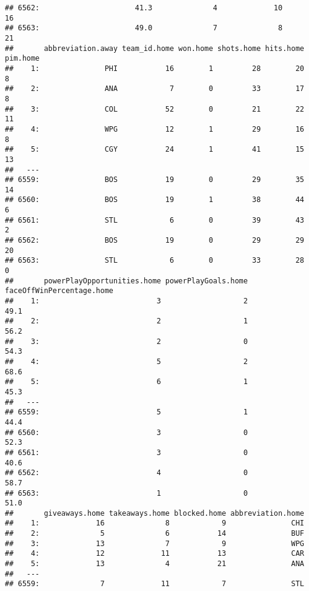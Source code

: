 \documentclass[
]{article}
\begin{document}
\begin{verbatim}
## 6562:                      41.3              4             10           16
## 6563:                      49.0              7              8           21
##       abbreviation.away team_id.home won.home shots.home hits.home pim.home
##    1:               PHI           16        1         28        20        8
##    2:               ANA            7        0         33        17        8
##    3:               COL           52        0         21        22       11
##    4:               WPG           12        1         29        16        8
##    5:               CGY           24        1         41        15       13
##   ---                                                                      
## 6559:               BOS           19        0         29        35       14
## 6560:               BOS           19        1         38        44        6
## 6561:               STL            6        0         39        43        2
## 6562:               BOS           19        0         29        29       20
## 6563:               STL            6        0         33        28        0
##       powerPlayOpportunities.home powerPlayGoals.home faceOffWinPercentage.home
##    1:                           3                   2                      49.1
##    2:                           2                   1                      56.2
##    3:                           2                   0                      54.3
##    4:                           5                   2                      68.6
##    5:                           6                   1                      45.3
##   ---                                                                          
## 6559:                           5                   1                      44.4
## 6560:                           3                   0                      52.3
## 6561:                           3                   0                      40.6
## 6562:                           4                   0                      58.7
## 6563:                           1                   0                      51.0
##       giveaways.home takeaways.home blocked.home abbreviation.home
##    1:             16              8            9               CHI
##    2:              5              6           14               BUF
##    3:             13              7            9               WPG
##    4:             12             11           13               CAR
##    5:             13              4           21               ANA
##   ---                                                             
## 6559:              7             11            7               STL

\end{verbatim}
\end{document}
